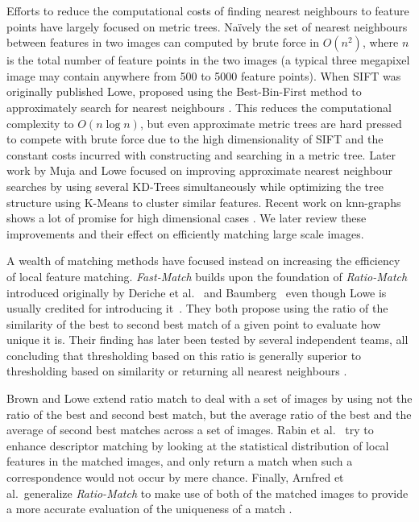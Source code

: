 \documentclass[runningheads]{llncs}
\begin{document}
Efforts to reduce the computational costs of finding nearest neighbours to feature points have largely focused on metric trees. Na\"ively the set of nearest neighbours between features in two images can computed by brute force in $O(n^2)$, where $n$ is the total number of feature points in the two images (a typical three megapixel image may contain anywhere from 500 to 5000 feature points). When SIFT was originally published Lowe, proposed using the Best-Bin-First method to approximately search for nearest neighbours \cite{beis1997shape,lowe1999object}. This reduces the computational complexity to $O(n\log n)$, but even approximate metric trees are hard pressed to compete with brute force due to the high dimensionality of SIFT and the constant costs incurred with constructing and searching in a metric tree. Later work by Muja and Lowe \cite{muja2009fast} focused on improving approximate nearest neighbour searches by using several KD-Trees simultaneously while optimizing the tree structure using K-Means to cluster similar features. Recent work on knn-graphs shows a lot of promise for high dimensional cases \cite{dong2011efficient}. We later review these improvements and their effect on efficiently matching large scale images.

A wealth of matching methods have focused instead on increasing the efficiency of local feature matching. \emph{Fast-Match} builds upon the foundation of \emph{Ratio-Match} introduced originally by Deriche et al.~\cite{deriche1994robust} and Baumberg~\cite{baumberg2000reliable} even though Lowe is usually credited for introducing it~\cite{lowe2004sift}. They both propose using the ratio of the similarity of the best to second best match of a given point to evaluate how unique it is. Their finding has later been tested by several independent teams, all concluding that thresholding based on this ratio is generally superior to thresholding based on similarity or returning all nearest neighbours \cite{lowe2004sift,mikolajczyk2005performance,moreels2007evaluation,rabin2009statistical}.

Brown and Lowe \cite{brown2005multi} extend ratio match to deal with a set of images by using not the ratio of the best and second best match, but the average ratio of the best and the average of second best matches across a set of images.  Rabin et al.\ \cite{rabin2009statistical} try to enhance descriptor matching by looking at the statistical distribution of local features in the matched images, and only return a match when such a correspondence would not occur by mere chance. Finally, Arnfred et al.\ generalize \emph{Ratio-Match} to make use of both of the matched images to provide a more accurate evaluation of the uniqueness of a match \cite{arnfred2013mirror}.
\end{document}
